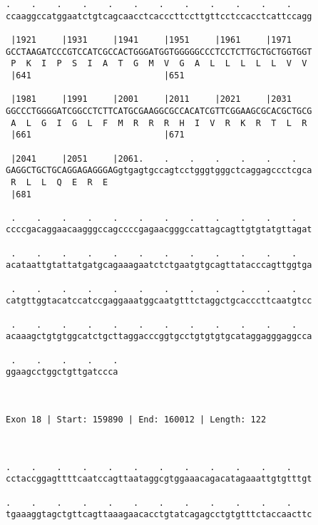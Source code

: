 \documentclass{article}
\begin{document}
\begin{Verbatim}
.    .    .    .    .    .    .    .    .    .    .    .    
ccaaggccatggaatctgtcagcaacctcacccttccttgttcctccacctcattccagg
                                                            
 |1921     |1931     |1941     |1951     |1961     |1971    
GCCTAAGATCCCGTCCATCGCCACTGGGATGGTGGGGGCCCTCCTCTTGCTGCTGGTGGT
 P  K  I  P  S  I  A  T  G  M  V  G  A  L  L  L  L  L  V  V 
 |641                          |651                         
  
 |1981     |1991     |2001     |2011     |2021     |2031    
GGCCCTGGGGATCGGCCTCTTCATGCGAAGGCGCCACATCGTTCGGAAGCGCACGCTGCG
 A  L  G  I  G  L  F  M  R  R  R  H  I  V  R  K  R  T  L  R 
 |661                          |671                         
  
 |2041     |2051     |2061.    .    .    .    .    .    .   
GAGGCTGCTGCAGGAGAGGGAGgtgagtgccagtcctgggtgggctcaggagccctcgca
 R  L  L  Q  E  R  E                                        
 |681                                                       
  
 .    .    .    .    .    .    .    .    .    .    .    .   
ccccgacaggaacaagggccagccccgagaacgggccattagcagttgtgtatgttagat
                                                            
 .    .    .    .    .    .    .    .    .    .    .    .   
acataattgtattatgatgcagaaagaatctctgaatgtgcagttatacccagttggtga
                                                            
 .    .    .    .    .    .    .    .    .    .    .    .   
catgttggtacatccatccgaggaaatggcaatgtttctaggctgcacccttcaatgtcc
                                                            
 .    .    .    .    .    .    .    .    .    .    .    .   
acaaagctgtgtggcatctgcttaggacccggtgcctgtgtgtgcataggagggaggcca
                                                            
 .    .    .    .    .
ggaagcctggctgttgatccca
                      
                      
 
Exon 18 | Start: 159890 | End: 160012 | Length: 122



.    .    .    .    .    .    .    .    .    .    .    .    
cctaccggagttttcaatccagttaataggcgtggaaacagacatagaaattgtgtttgt
                                                            
.    .    .    .    .    .    .    .    .    .    .    .    
tgaaaggtagctgttcagttaaagaacacctgtatcagagcctgtgtttctaccaacttc
                                                            

\end{Verbatim}
\end{document}
